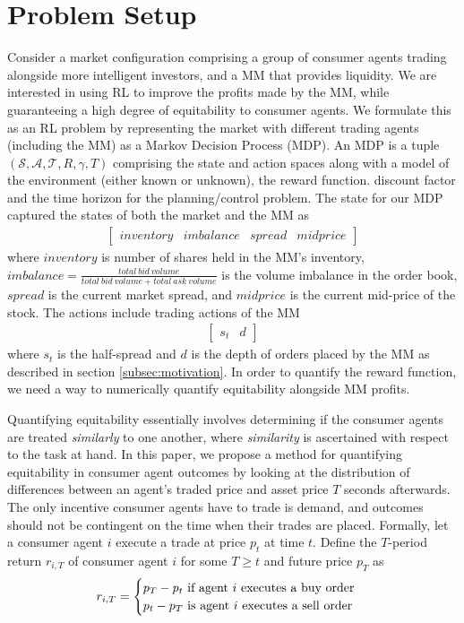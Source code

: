 \documentclass[sigconf]{acmart}
\begin{document}
\section{Problem Setup\label{sec:problem}}
Consider a market configuration comprising a group of consumer agents trading alongside more intelligent investors, and a MM that provides liquidity. We are interested in using RL to improve the profits made by the MM, while guaranteeing a high degree of equitability to consumer agents. We formulate this as an RL problem by representing the market with different trading agents (including the MM) as a Markov Decision Process (MDP). An MDP is a tuple $(\mathcal{S},\mathcal{A},\mathcal{T},R,\gamma,T)$ comprising the state and action spaces along with a model of the environment (either known or unknown), the reward function. discount factor and the time horizon for the planning/control problem. The state for our MDP captured the states of both the market and the MM as
\begin{align}
\begin{bmatrix}inventory&imbalance&spread&midprice\end{bmatrix}\label{eq:state}
\end{align}
where $inventory$ is number of shares held in the MM's inventory, $imbalance=\frac{total\ bid\ volume}{total\ bid\ volume +total\ ask\ volume}$ is the volume imbalance in the order book, $spread$ is the current market spread, and $midprice$ is the current mid-price of the stock. The actions include trading actions of the MM\begin{align}
    \begin{bmatrix}s_t&d\end{bmatrix}\nonumber
\end{align}
where $s_t$ is the half-spread and $d$ is the depth of orders placed by the MM as described in section \ref{subsec:motivation}. In order to quantify the reward function, we need a way to numerically quantify equitability alongside MM profits. 

Quantifying equitability essentially involves determining if the consumer agents are treated \textit{similarly} to one another, where \textit{similarity} is ascertained with respect to the task at hand. In this paper, we propose a method for quantifying equitability in consumer agent outcomes by looking at the distribution of differences between an agent's traded price and asset price $T$ seconds afterwards. The only incentive consumer agents have to trade is demand, and outcomes should not be contingent on the time when their trades are placed. Formally, let a consumer agent $i$ execute a trade at price $p_t$ at time $t$. Define the $T$-period return $r_{i,T}$ of consumer agent $i$ for some $T \geq t$ and future price $p_T$ as\begin{align}
r_{i,T}=\begin{cases}
p_T - p_t  \textnormal{ if agent $i$ executes a buy order} \\
p_t - p_T  \textnormal{ is agent $i$ executes a sell order}
\end{cases}\label{eq:returns}
\end{align}
\end{document}
